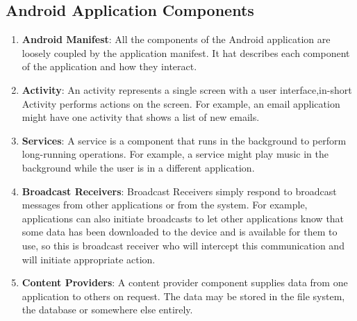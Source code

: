\documentclass{article}
\begin{document}
    \subsection {Android Application Components}
        \begin{enumerate}
        	\item \textbf{Android Manifest}: All the components of the Android application are loosely coupled by the application manifest. It hat describes each component of the application and how they interact.
			\item \textbf{Activity}: An activity represents a single screen with a user interface,in-short Activity performs actions on the screen. For example, an email application might have one activity that shows a list of new emails.
            \item \textbf{Services}: A service is a component that runs in the background to perform long-running operations. For example, a service might play music in the background while the user is in a different application.
            \item \textbf{Broadcast Receivers}: Broadcast Receivers simply respond to broadcast messages from other applications or from the system. For example, applications can also initiate broadcasts to let other applications know that some data has been downloaded to the device and is available for them to use, so this is broadcast receiver who will intercept this communication and will initiate appropriate action.
            \item \textbf{Content Providers}: A content provider component supplies data from one application to others on request. The data may be stored in the file system, the database or somewhere else entirely.
		\end{enumerate} 
        
\end{document}
